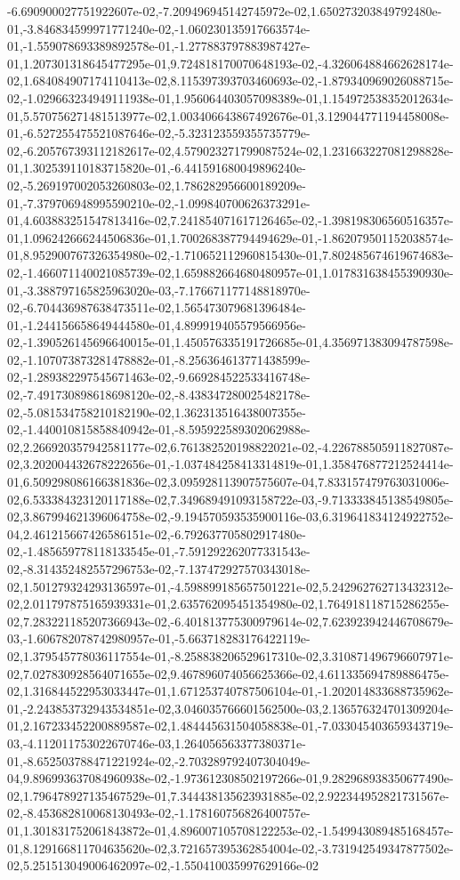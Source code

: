 -6.690900027751922607e-02,-7.209496945142745972e-02,1.650273203849792480e-01,-3.846834599971771240e-02,-1.060230135917663574e-01,-1.559078693389892578e-01,-1.277883797883987427e-01,1.207301318645477295e-01,9.724818170070648193e-02,-4.326064884662628174e-02,1.684084907174110413e-02,8.115397393703460693e-02,-1.879340969026088715e-02,-1.029663234949111938e-01,1.956064403057098389e-01,1.154972538352012634e-01,5.570756271481513977e-02,1.003406643867492676e-01,3.129044771194458008e-01,-6.527255475521087646e-02,-5.323123559355735779e-02,-6.205767393112182617e-02,4.579023271799087524e-02,1.231663227081298828e-01,1.302539110183715820e-01,-6.441591680049896240e-02,-5.269197002053260803e-02,1.786282956600189209e-01,-7.379706948995590210e-02,-1.099840700626373291e-01,4.603883251547813416e-02,7.241854071617126465e-02,-1.398198306560516357e-01,1.096242666244506836e-01,1.700268387794494629e-01,-1.862079501152038574e-01,8.952900767326354980e-02,-1.710652112960815430e-01,7.802485674619674683e-02,-1.466071140021085739e-02,1.659882664680480957e-01,1.017831638455390930e-01,-3.388797165825963020e-03,-7.176671177148818970e-02,-6.704436987638473511e-02,1.565473079681396484e-01,-1.244156658649444580e-01,4.899919405579566956e-02,-1.390526145696640015e-01,1.450576335191726685e-01,4.356971383094787598e-02,-1.107073873281478882e-01,-8.256364613771438599e-02,-1.289382297545671463e-02,-9.669284522533416748e-02,-7.491730898618698120e-02,-8.438347280025482178e-02,-5.081534758210182190e-02,1.362313516438007355e-02,-1.440010815858840942e-01,-8.595922589302062988e-02,2.266920357942581177e-02,6.761382520198822021e-02,-4.226788505911827087e-02,3.202004432678222656e-01,-1.037484258413314819e-01,1.358476877212524414e-01,6.509298086166381836e-02,3.095928113907575607e-04,7.833157479763031006e-02,6.533384323120117188e-02,7.349689491093158722e-03,-9.713333845138549805e-02,3.867994621396064758e-02,-9.194570593535900116e-03,6.319641834124922752e-04,2.461215667426586151e-02,-6.792637705802917480e-02,-1.485659778118133545e-01,-7.591292262077331543e-02,-8.314352482557296753e-02,-7.137472927570343018e-02,1.501279324293136597e-01,-4.598899185657501221e-02,5.242962762713432312e-02,2.011797875165939331e-01,2.635762095451354980e-02,1.764918118715286255e-02,7.283221185207366943e-02,-6.401813775300979614e-02,7.623923942446708679e-03,-1.606782078742980957e-01,-5.663718283176422119e-02,1.379545778036117554e-01,-8.258838206529617310e-02,3.310871496796607971e-02,7.027830928564071655e-02,9.467896074056625366e-02,4.611335694789886475e-02,1.316844522953033447e-01,1.671253740787506104e-01,-1.202014833688735962e-01,-2.243853732943534851e-02,3.046035766601562500e-03,2.136576324701309204e-01,2.167233452200889587e-02,1.484445631504058838e-01,-7.033045403659343719e-03,-4.112011753022670746e-03,1.264056563377380371e-01,-8.652503788471221924e-02,-2.703289792407304049e-04,9.896993637084960938e-02,-1.973612308502197266e-01,9.282968938350677490e-02,1.796478927135467529e-01,7.344438135623931885e-02,2.922344952821731567e-02,-8.453682810068130493e-02,-1.178160756826400757e-01,1.301831752061843872e-01,4.896007105708122253e-02,-1.549943089485168457e-01,8.129166811704635620e-02,3.721657395362854004e-02,-3.731942549347877502e-02,5.251513049006462097e-02,-1.550410035997629166e-02
